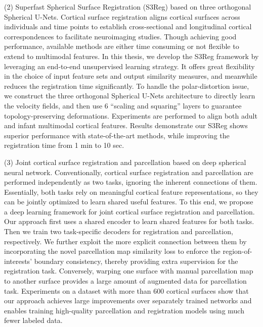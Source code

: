 (2) Superfast Spherical Surface Registration (S3Reg) based on three orthogonal Spherical U-Nets. Cortical surface registration aligns cortical surfaces across individuals and time points to establish cross-sectional and longitudinal cortical correspondences to facilitate neuroimaging studies. Though achieving good performance, available methods are either time consuming or not flexible to extend to multimodal features. In this thesis, we develop the S3Reg framework by leveraging an end-to-end unsupervised learning strategy. It offers great flexibility in the choice of input feature sets and output similarity measures, and meanwhile reduces the registration time significantly. To handle the polar-distortion issue, we construct the three orthogonal Spherical U-Nets architecture to directly learn the velocity fields, and then use 6 “scaling and squaring” layers to guarantee topology-preserving deformations. Experiments are performed to align both adult and infant multimodal cortical features. Results demonstrate our S3Reg shows superior performance with state-of-the-art methods, while improving the registration time from 1 min to 10 sec.	

(3) Joint cortical surface registration and parcellation based on deep spherical neural network. Conventionally, cortical surface registration and parcellation are performed independently as two tasks, ignoring the inherent connections of them. Essentially, both tasks rely on meaningful cortical feature representations, so they can be jointly optimized to learn shared useful features. To this end, we propose a deep learning framework for joint cortical surface registration and parcellation. Our approach first uses a shared encoder to learn shared features for both tasks. Then we train two task-specific decoders for registration and parcellation, respectively. We further exploit the more explicit connection between them by incorporating the novel parcellation map similarity loss to enforce the region-of-interests' boundary consistency, thereby providing extra supervision for the registration task. Conversely, warping one surface with manual parcellation map to another surface provides a large amount of augmented data for parcellation task. Experiments on a dataset with more than 600 cortical surfaces show that our approach achieves large improvements over separately trained networks and enables training high-quality parcellation and registration models using much fewer labeled data.
 
